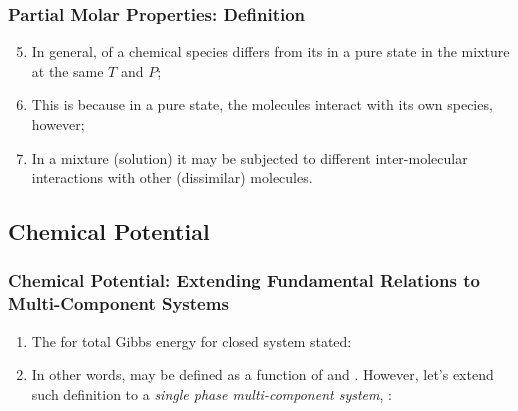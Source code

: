\documentclass[10pt,compress,handout,ignorenonframetext,unknownkeysallowed]{beamer}
\begin{document}
\begin{frame}
  \frametitle{Partial Molar Properties: Definition}
  \begin{enumerate}\setcounter{enumi}{4}
    \item<1-> In general,  of a chemical species differs from its  in a pure state in the mixture at the same $T$ and $P$; %
    \item<2-> This is because in a pure state, the molecules interact with its own species, however;
    \item<3-> In a mixture (\ie solution) it may be subjected to different inter-molecular interactions with other (dissimilar) molecules. 
  \end{enumerate}
\end{frame}
\normalsize

\subsection{Chemical Potential}  

\begin{frame}
  \frametitle{Chemical Potential: Extending Fundamental Relations to Multi-Component Systems} 
  \begin{enumerate}
    \item<1-> The  for total Gibbs energy  for closed system stated:
     \item<2-> In other words,  may be defined as a function of  and . However, let's extend such definition to a {\it single phase multi-component system}, \ie {}:
  \end{enumerate}
\end{frame}
\normalsize
  
\end{document}
